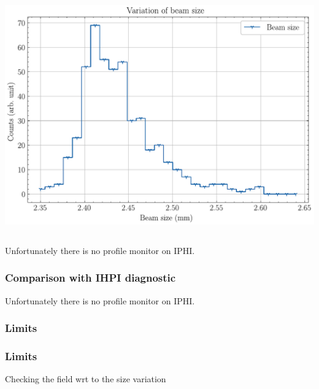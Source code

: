 \begin{frame}
\begin{columns}[T]
\begin{column}{0.45\textwidth}
      \includegraphics[width=1\textwidth]{04_Test/fig/fig000_hist_variation_b}
    \end{column}
  \end{columns}
  \begin{alertblock}{}
    Unfortunately there is no profile monitor on IPHI.
  \end{alertblock}
\end{frame}

\begin{frame}
  \frametitle{Comparison with IHPI diagnostic}
  \begin{alertblock}{}
    Unfortunately there is no profile monitor on IPHI.
  \end{alertblock}
\end{frame}

\begin{frame}
  \frametitle{Limits}
  \begin{alertblock}{}

  \end{alertblock}
\end{frame}

\begin{frame}
  \frametitle{Limits}
  \begin{alertblock}{}
    Checking the field wrt to the size variation
  \end{alertblock}
\end{frame}

